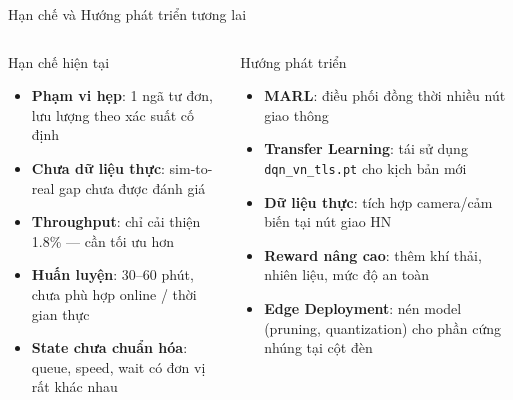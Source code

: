 \begin{frame}{Hạn chế và Hướng phát triển tương lai}
  \begin{columns}[T]
    \begin{alertblock}{Hạn chế hiện tại}
      \begin{itemize}
        \setlength{\itemsep}{4pt}
        \item \textbf{Phạm vi hẹp}: 1 ngã tư đơn, lưu lượng theo xác suất cố định
        \item \textbf{Chưa dữ liệu thực}: sim-to-real gap chưa được đánh giá
        \item \textbf{Throughput}: chỉ cải thiện 1.8\% --- cần tối ưu hơn
        \item \textbf{Huấn luyện}: 30--60 phút, chưa phù hợp online / thời gian thực
        \item \textbf{State chưa chuẩn hóa}: queue, speed, wait có đơn vị rất khác nhau
      \end{itemize}
    \end{alertblock}

    \begin{exampleblock}{Hướng phát triển}
      \begin{itemize}
        \setlength{\itemsep}{4pt}
        \item \textbf{MARL}: điều phối đồng thời nhiều nút giao thông
        \item \textbf{Transfer Learning}: tái sử dụng \texttt{dqn\_vn\_tls.pt} cho kịch bản mới
        \item \textbf{Dữ liệu thực}: tích hợp camera/cảm biến tại nút giao HN
        \item \textbf{Reward nâng cao}: thêm khí thải, nhiên liệu, mức độ an toàn
        \item \textbf{Edge Deployment}: nén model (pruning, quantization) cho phần cứng nhúng tại cột đèn
      \end{itemize}
    \end{exampleblock}
  \end{columns}
\end{frame}

